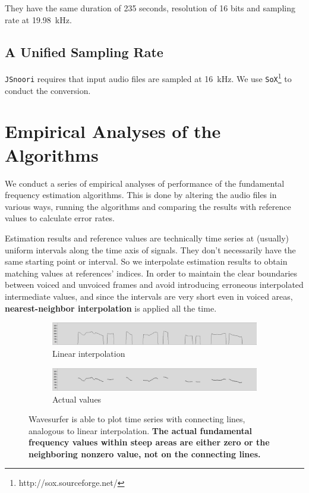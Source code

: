 \documentclass[11pt,a4paper,titlepage]{article}
\begin{document}
They have the same duration of 235 seconds, resolution of 16 bits and sampling rate at \SI{19.98}{\kilo\hertz}.

\subsection{A Unified Sampling Rate}

\texttt{JSnoori} requires that input audio files are sampled at \SI{16}{\kilo\hertz}.
We use \texttt{SoX}\footnote{http://sox.sourceforge.net/} to conduct the conversion.

\newpage

\section{Empirical Analyses of the Algorithms} \label{emp-aly}

We conduct a series of empirical analyses of performance of the fundamental frequency estimation algorithms.
This is done by altering the audio files in various ways, running the algorithms and comparing the results with reference values to calculate error rates.

Estimation results and reference values are technically time series at (usually) uniform intervals along the time axis of signals.
They don't necessarily have the same starting point or interval.
So we interpolate estimation results to obtain matching values at references' indices.
In order to maintain the clear boundaries between voiced and unvoiced frames and avoid introducing erroneous interpolated intermediate values, and since the intervals are very short even in voiced areas, \textbf{nearest-neighbor interpolation} is applied all the time.

\begin{figure}[htbp]
  \centering
  \begin{subfigure}{\textwidth}
    \includegraphics[width=\textwidth]{f0s-lp.png}
    \caption{Linear interpolation}
    \label{fig:f0s-lp}
  \end{subfigure}

  \begin{subfigure}{\textwidth}
    \includegraphics[width=\textwidth]{f0s-real.png}
    \caption{Actual values}
    \label{fig:f0s-real}
  \end{subfigure}

  \caption[Data plotting options in Wavesurfer.]{Wavesurfer is able to plot time series with connecting lines, analogous to linear interpolation.
    \textbf{The actual fundamental frequency values within steep areas are either zero or the neighboring nonzero value, not on the connecting lines.}}
  \label{fig:f0s}
\end{figure}
\end{document}
